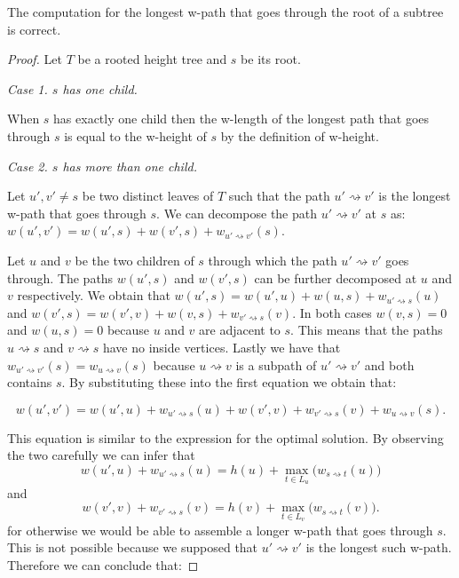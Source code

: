 \begin{lem} The computation for the longest w-path that goes through the root of a subtree is correct. \end{lem}
\begin{proof}

   Let $T$ be a rooted height tree and $s$ be its root.

   \em Case 1. $s$ has one child. \em

   When $s$ has exactly one child then the w-length of the longest path that goes through $s$ is equal to the w-height of $s$ by the definition of w-height.

   \em Case 2. $s$ has more than one child. \em

   Let $u', v' \ne s$ be two distinct leaves of $T$ such that the path $u' \rightsquigarrow v'$ is the longest w-path that goes through $s$.
   We can decompose the path $u' \rightsquigarrow v'$ at $s$ as: $w(u', v') = w(u', s) + w(v', s) + w_{u' \rightsquigarrow v'}(s)$.

   Let $u$ and $v$ be the two children of $s$ through which the path $u' \rightsquigarrow v'$ goes through.
   The paths $w(u', s)$ and $w(v', s)$ can be further decomposed at $u$ and $v$ respectively. We obtain that
   $w(u', s) = w(u', u) + w(u, s) + w_{u' \rightsquigarrow s}(u)$ and
   $w(v', s) = w(v', v) + w(v, s) + w_{v' \rightsquigarrow s}(v)$.
   In both cases $w(v, s) = 0$ and $w(u, s) = 0$ because $u$ and $v$ are adjacent to $s$. This means that the paths $u \rightsquigarrow s$ and $v \rightsquigarrow s$ have no inside vertices.
   Lastly we have that $w_{u' \rightsquigarrow v'}(s) = w_{u \rightsquigarrow v}(s)$ because $u \rightsquigarrow v$ is a subpath of $u' \rightsquigarrow v'$ and both contains $s$.
   By substituting these into the first equation we obtain that:

   $$w(u', v') = w(u', u) + w_{u' \rightsquigarrow s}(u) + w(v', v) + w_{v' \rightsquigarrow s}(v) + w_{u \rightsquigarrow v}(s). $$

   This equation is similar to the expression for the optimal solution. By observing the two carefully we can infer that
   $$w(u', u) + w_{u' \rightsquigarrow s}(u) = h(u) + \max\limits_{t \in L_u}\Big(w_{s \rightsquigarrow t}(u)\Big)$$
   and
   $$w(v', v) + w_{v' \rightsquigarrow s}(v) = h(v) + \max\limits_{t \in L_v}\Big(w_{s \rightsquigarrow t}(v)\Big).$$
   for otherwise we would be able to assemble a longer w-path that goes through $s$. This is not possible because we supposed that $u' \rightsquigarrow v'$ is the longest such w-path. Therefore we can conclude that:


\end{proof}
